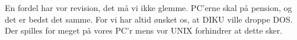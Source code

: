 \documentclass{article}
\begin{document}
\begin{song}
    En fordel har vor revision,             
                det må vi ikke glemme.                 
                PC'erne skal på pension,               
                og det er bedst det samme.             
                For vi har altid ønsket os,            
                at DIKU ville droppe DOS.              
                Der spilles for meget på vores PC'r    
                mens vor UNIX forhindrer at dette sker.
\end{song}
\end{document}
